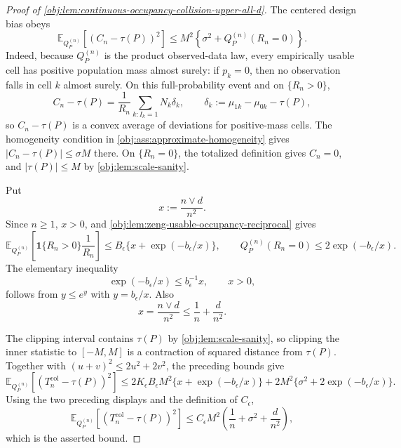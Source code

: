 \begin{proof}[Proof of \cref{obj:lem:continuous-occupancy-collision-upper-all-d}]
The centered design bias obeys
\[
\mathbb E_{Q_P^{(n)}}\!\left[(C_n-\tau(P))^2\right]
\le
M^2\left\{\sigma^2+Q_P^{(n)}(R_n=0)\right\}.
\]
Indeed, because \(Q_P^{(n)}\) is the product observed-data law, every empirically usable cell has positive population mass almost surely: if \(p_k=0\), then no observation falls in cell \(k\) almost surely.  On this full-probability event and on \(\{R_n>0\}\),
\[
C_n-\tau(P)
=
\frac1{R_n}\sum_{k:I_k=1}N_k\delta_k,
\qquad
\delta_k:=\mu_{1k}-\mu_{0k}-\tau(P),
\]
so \(C_n-\tau(P)\) is a convex average of deviations for positive-mass cells.  The homogeneity condition in \cref{obj:ass:approximate-homogeneity} gives \(|C_n-\tau(P)|\le\sigma M\) there.  On \(\{R_n=0\}\), the totalized definition gives \(C_n=0\), and \(|\tau(P)|\le M\) by \cref{obj:lem:scale-sanity}. %

Put
\[
x:=\frac{n\vee d}{n^2}.
\]
Since \(n\ge1\), \(x>0\), and \cref{obj:lem:zeng-usable-occupancy-reciprocal} gives
\[
\mathbb E_{Q_P^{(n)}}\!\left[
\mathbf 1\{R_n>0\}\frac1{R_n}
\right]
\le
B_\epsilon\{x+\exp(-b_\epsilon/x)\},
\qquad
Q_P^{(n)}(R_n=0)\le 2\exp(-b_\epsilon/x).
\]
The elementary inequality
\[
\exp(-b_\epsilon/x)\le b_\epsilon^{-1}x,
\qquad x>0,
\]
follows from \(y\le e^y\) with \(y=b_\epsilon/x\).  Also
\[
x=\frac{n\vee d}{n^2}\le \frac1n+\frac d{n^2}.
\]

The clipping interval contains \(\tau(P)\) by \cref{obj:lem:scale-sanity}, so clipping the inner statistic to \([-M,M]\) is a contraction of squared distance from \(\tau(P)\).  Together with \((u+v)^2\le2u^2+2v^2\), the preceding bounds give
\[
\mathbb E_{Q_P^{(n)}}\!\left[(T_n^{\mathrm{col}}-\tau(P))^2\right]
\le
2K_\epsilon B_\epsilon M^2\{x+\exp(-b_\epsilon/x)\}
+
2M^2\{\sigma^2+2\exp(-b_\epsilon/x)\}.
\]
Using the two preceding displays and the definition of \(C_\epsilon\),
\[
\mathbb E_{Q_P^{(n)}}\!\left[(T_n^{\mathrm{col}}-\tau(P))^2\right]
\le
C_\epsilon M^2
\left(\frac1n+\sigma^2+\frac d{n^2}\right),
\]
which is the asserted bound. %
\end{proof}
